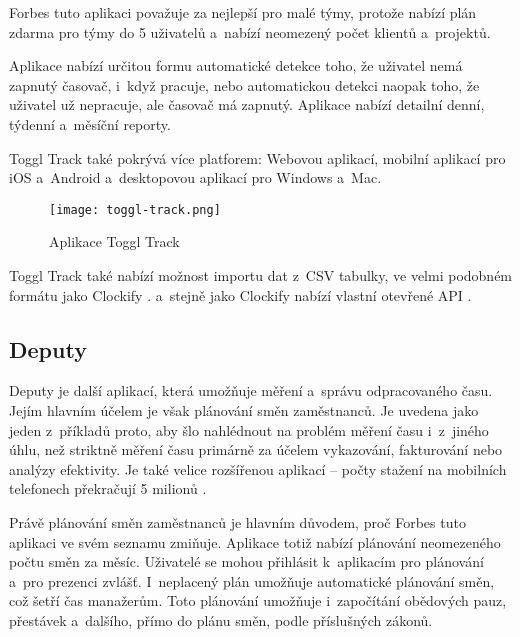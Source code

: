 Forbes tuto aplikaci považuje za nejlepší pro malé týmy, protože nabízí plán zdarma pro týmy do 5 uživatelů a~nabízí neomezený počet klientů a~projektů. \cite{forbes-tracking-apps-article}

Aplikace nabízí určitou formu automatické detekce toho, že uživatel nemá zapnutý časovač, i~když pracuje, nebo automatickou detekci naopak toho, že uživatel už nepracuje, ale časovač má zapnutý. Aplikace nabízí detailní denní, týdenní a~měsíční reporty.

Toggl Track také pokrývá více platforem: Webovou aplikací, mobilní aplikací pro iOS a~Android a~desktopovou aplikací pro Windows a~Mac. \cite{toggl-track}

\begin{figure}[h]
	\centering
	\texttt{[image: toggl-track.png]}
	\caption{Aplikace Toggl Track \cite{toggl-track}}
\end{figure}

Toggl Track také nabízí možnost importu dat z~CSV tabulky, ve velmi podobném formátu jako Clockify \cite{toggl-track-import-csv}. a~stejně jako Clockify nabízí vlastní otevřené API \cite{toggl-track-api}.

\subsection{Deputy}\label{deputy}

Deputy je další aplikací, která umožňuje měření a~správu odpracovaného času. Jejím hlavním účelem je však plánování směn zaměstnanců. Je uvedena jako jeden z~příkladů proto, aby šlo nahlédnout na problém měření času i~z~jiného úhlu, než striktně měření času primárně za účelem vykazování, fakturování nebo analýzy efektivity. Je také velice rozšířenou aplikací – počty stažení na mobilních telefonech překračují 5 milionů \cite{deputy-app-magic}.

Právě plánování směn zaměstnanců je hlavním důvodem, proč Forbes tuto aplikaci ve svém seznamu zmiňuje. Aplikace totiž nabízí plánování neomezeného počtu směn za měsíc. Uživatelé se mohou přihlásit k~aplikacím pro plánování a~pro prezenci zvlášť. I~neplacený plán umožňuje automatické plánování směn, což šetří čas manažerům. Toto plánování umožňuje i~započítání obědových pauz, přestávek a~dalšího, přímo do plánu směn, podle příslušných zákonů.  \cite{forbes-tracking-apps-article}

